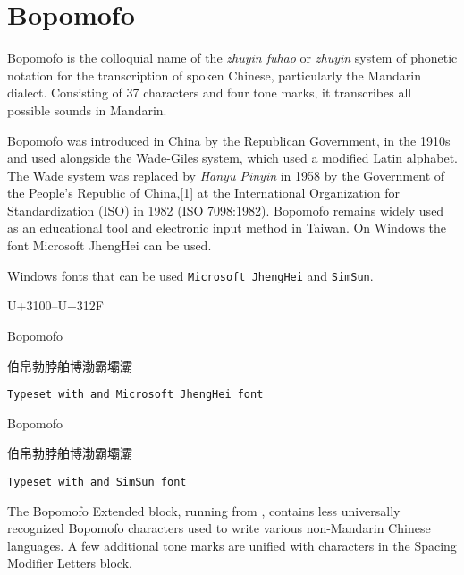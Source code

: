 

\section{Bopomofo}
\label{s:bopomofo}
Bopomofo is the colloquial name of the \textit{zhuyin fuhao} or \textit{zhuyin} system of phonetic notation for the transcription of spoken Chinese, particularly the Mandarin dialect. Consisting of 37 characters and four tone marks, it transcribes all possible sounds in Mandarin. 

Bopomofo was introduced in China by the Republican Government, in the 1910s and used alongside the Wade-Giles system, which used a modified Latin alphabet. The Wade system was replaced by \textit{Hanyu Pinyin} in 1958 by the Government of the People's Republic of China,[1] at the International Organization for Standardization (ISO) in 1982 (ISO 7098:1982). Bopomofo remains widely used as an educational tool and electronic input method in Taiwan. On Windows the font Microsoft JhengHei can be used. 

Windows fonts that can be used \texttt{Microsoft JhengHei} and \texttt{SimSun}.

U+3100–U+312F
\newfontfamily{}

\begin{scriptexample}[]{Bopomofo}
{\centering\bopomofo 

伯帛勃脖舶博渤霸壩灞

}

\hfill \texttt{Typeset with \cmd{\bopomofo} and Microsoft JhengHei font }
\end{scriptexample}

\begin{scriptexample}[]{Bopomofo}
\newfontfamily{}
{\centering\simsun 

伯帛勃脖舶博渤霸壩灞

}
\hfill \texttt{Typeset with \cmd{\bopomofo} and SimSun font }
\end{scriptexample}

\arial

The Bopomofo Extended block, running from , contains less universally recognized Bopomofo characters used to write various non-Mandarin Chinese languages. A few additional tone marks are unified with characters in the Spacing Modifier Letters block. 









